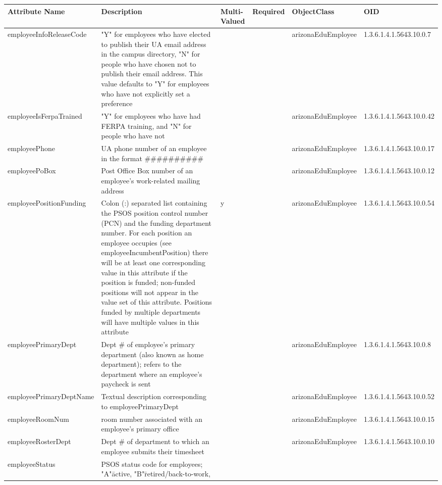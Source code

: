 \documentclass[12pt,notitlepage]{article}
\begin{document}
{\begin{tabular}{|p{3cm}|p{4cm}|p{0.7cm}|p{1cm}|l|l|}
\hline
\textbf{Attribute Name}& \textbf{Description} & \textbf{Multi-Valued} 
& \textbf{Required} & \textbf{ObjectClass} & \textbf{OID} \\
\hline
employeeInfoReleaseCode & "Y" for employees who have elected to publish their UA email address in the campus directory, "N" for people who have chosen not to publish their email address. This value defaults to "Y" for employees who have not explicitly set a preference & & & arizonaEduEmployee & 1.3.6.1.4.1.5643.10.0.7\\
\hline
employeeIsFerpaTrained & "Y" for employees who have had FERPA training, and "N" for people who have not & & & arizonaEduEmployee & 1.3.6.1.4.1.5643.10.0.42\\
\hline
employeePhone & UA phone number of an employee in the format \#\#\#\#\#\#\#\#\#\# & & & arizonaEduEmployee & 1.3.6.1.4.1.5643.10.0.17\\
\hline
employeePoBox & Post Office Box number of an employee's work-related mailing address & & & arizonaEduEmployee & 1.3.6.1.4.1.5643.10.0.12\\
\hline
employeePositionFunding & Colon (:) separated list containing the PSOS position control number 
(PCN) and the funding department number. For each position an employee occupies (see 
employeeIncumbentPosition) there will be at least one corresponding value in this attribute if 
the position is funded; non-funded positions will not appear in the value set of this attribute.
  Positions funded by multiple departments will have multiple values in this attribute & y& & arizonaEduEmployee & 1.3.6.1.4.1.5643.10.0.54 \\
\hline
employeePrimaryDept & Dept \# of employee's primary department (also known as home department); 
refers to the department where an employee's paycheck is sent & & & arizonaEduEmployee & 1.3.6.1.4.1.5643.10.0.8\\
\hline
employeePrimaryDeptName & Textual description corresponding to employeePrimaryDept & & & arizonaEduEmployee & 1.3.6.1.4.1.5643.10.0.52\\
\hline
employeeRoomNum & room number associated with an employee's primary office & & & arizonaEduEmployee & 1.3.6.1.4.1.5643.10.0.15\\
\hline
employeeRosterDept & Dept \# of department to which an employee submits their timesheet & & & arizonaEduEmployee & 1.3.6.1.4.1.5643.10.0.10\\
\hline
employeeStatus & PSOS status code for employees; "A"\=active, "B"\=retired/back-to-work, 

\end{tabular}}
\end{document}
